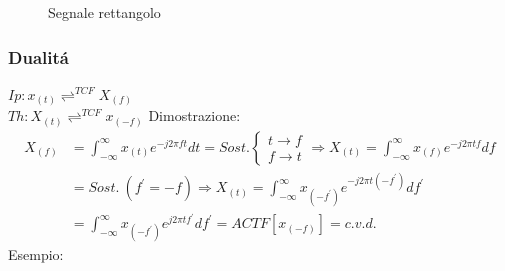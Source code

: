 {\begin{figure}[H]
                        \caption{Segnale rettangolo}
                        \label{fig:es linearita}
                    \end{figure}                    
                }
                

        \subsubsection{Dualitá}\label{Dualita}
            $Ip: x_{(t)} \rightleftharpoons^{TCF} X_{(f)}$\\        
            $Th: X_{(t)} \rightleftharpoons^{TCF} x_{(-f)}$ 
            Dimostrazione:
            \begin{align}
                X_{(f)} & = \int_{-\infty}^{\infty} x_{(t)} e^{-j2\pi ft} dt = Sost. \begin{cases}
                    t \rightarrow f\\
                    f \rightarrow t
                \end{cases} \Rightarrow  X_{(t)} = \int_{-\infty}^{\infty} x_{(f)} e^{-j2\pi tf} df \nonumber \\
                        & =Sost.\ (f^\prime = -f) \Rightarrow  X_{(t)} = \int_{-\infty}^{\infty} x_{(-f^\prime)} e^{-j2\pi t(-f^\prime)} df^\prime\nonumber \\
                        & =\int_{-\infty}^{\infty} x_{(-f^\prime)} e^{j2\pi tf^\prime} df^\prime= ACTF[x_{(-f)}] = c.v.d.  \nonumber
            \end{align}
            Esempio:\\
